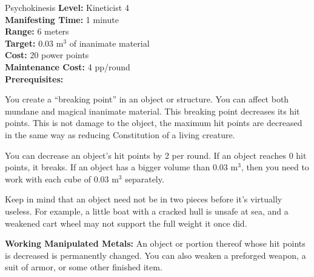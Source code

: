 {Psychokinesis}
{
	\textbf{Level:}
	Kineticist 4\\
	\textbf{Manifesting Time:}
	1 minute\\
	\textbf{Range:}
	6 meters\\
	\textbf{Target:}
	0.03 m$^3$ of inanimate material\\
	\textbf{Cost:}
	20 power points\\
	\textbf{Maintenance Cost:}
	4 pp/round\\
	\textbf{Prerequisites:}
	\\
}
{
	You create a ``breaking point'' in an object or structure. You can affect both mundane and magical inanimate material. This breaking point decreases its hit points. This is not damage to the object, the maximum hit points are decreased in the same way as reducing Constitution of a living creature.

	You can decrease an object's hit points by 2 per round. If an object reaches 0 hit points, it breaks. If an object has a bigger volume than 0.03 m$^3$, then you need to work with each cube of 0.03 m$^3$ separately.

	Keep in mind that an object need not be in two pieces before it's virtually useless. For example, a little boat with a cracked hull is unsafe at sea, and a weakened cart wheel may not support the full weight it once did.

	\textbf{Working Manipulated Metals:} An object or portion thereof whose hit points is decreased is permanently changed. You can also weaken a preforged weapon, a suit of armor, or some other finished item.
}
